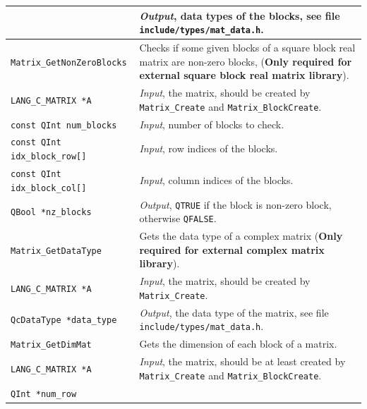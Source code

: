 \documentclass[a4paper,11pt,twoside,openright]{book}
\begin{document}
\begin{center}
\begin{longtable}{l|p{}}
      & \textsl{Output}, data types of the blocks, see file
        \verb|include/types/mat_data.h|.\\
    \hline
%
    \verb|Matrix_GetNonZeroBlocks|\index{\texttt{Matrix\_GetNonZeroBlocks}} %
      & Checks if some given blocks of a square block real matrix are non-zero blocks, %
        (\textbf{Only required for external square block real matrix library}).\\
    \hspace*{2ex}\verb|LANG_C_MATRIX *A| %
      & \textsl{Input}, the matrix, should be created by \verb|Matrix_Create|
        and \verb|Matrix_BlockCreate|.\\
    \hspace*{2ex}\verb|const QInt num_blocks| %
      & \textsl{Input}, number of blocks to check.\\
    \hspace*{2ex}\verb|const QInt idx_block_row[]| %
      & \textsl{Input}, row indices of the blocks.\\
    \hspace*{2ex}\verb|const QInt idx_block_col[]| %
      & \textsl{Input}, column indices of the blocks.\\
    \hspace*{2ex}\verb|QBool *nz_blocks| %
      & \textsl{Output}, \verb|QTRUE| if the block is non-zero block, %
        otherwise \verb|QFALSE|.\\
    \hline
%
    \verb|Matrix_GetDataType|\index{\texttt{Matrix\_GetDataType}} %
      & Gets the data type of a complex matrix %
        (\textbf{Only required for external complex matrix library}).\\
    \hspace*{2ex}\verb|LANG_C_MATRIX *A| %
      & \textsl{Input}, the matrix, should be created by \verb|Matrix_Create|.\\
    \hspace*{2ex}\verb|QcDataType *data_type| %
      & \textsl{Output}, the data type of the matrix, see file
        \verb|include/types/mat_data.h|.\\
    \hline
%
    \verb|Matrix_GetDimMat|\index{\texttt{Matrix\_GetDimMat}} %
      & Gets the dimension of each block of a matrix.\\
    \hspace*{2ex}\verb|LANG_C_MATRIX *A| %
      & \textsl{Input}, the matrix, should be at least created by \verb|Matrix_Create|
        and \verb|Matrix_BlockCreate|.\\
    \hspace*{2ex}\verb|QInt *num_row| %

\end{longtable}
\end{center}
\end{document}
